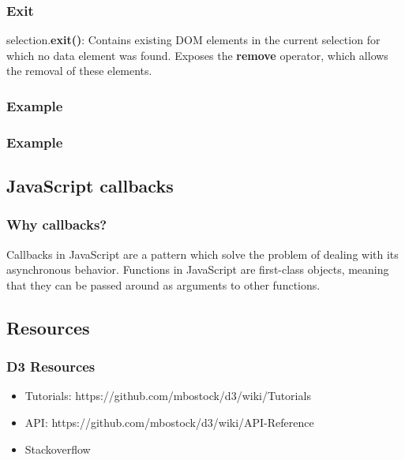 \documentclass[red]{beamer}
\begin{document}
\begin{frame}
  \frametitle{Exit}
  selection.\textbf{exit()}: Contains existing DOM elements in the current selection for which no data element was found. Exposes the \textbf{remove} operator, which allows the removal of these elements. 
\end{frame}

\begin{frame}
  \frametitle{Example}
  \lstexit
\end{frame}

\begin{frame}
  \frametitle{Example}
  \lstexitl
\end{frame}

\subsection{JavaScript callbacks}
\begin{frame}
  \frametitle{Why callbacks?}
  Callbacks in JavaScript are a pattern which solve the problem of dealing with its asynchronous behavior. Functions in JavaScript are first-class objects, meaning that they can be passed around as arguments to other functions. 

  \lstcallback
\end{frame}

\subsection{Resources}
\begin{frame}
  \frametitle{D3 Resources}
  \begin{itemize}
  \item<1-> Tutorials: https://github.com/mbostock/d3/wiki/Tutorials
  \item<2-> API: https://github.com/mbostock/d3/wiki/API-Reference
  \item<3-> Stackoverflow
  \end{itemize}
\end{frame}
\end{document}
